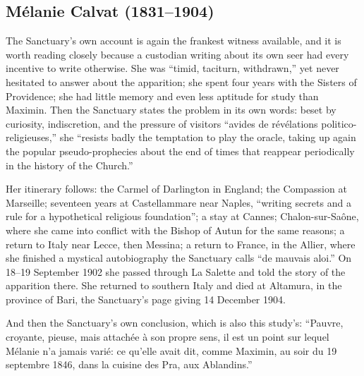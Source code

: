 \subsection{Mélanie Calvat (1831--1904)}

The Sanctuary's own account is again the frankest witness available,
and it is worth reading closely because a custodian writing about
its own seer had every incentive to write otherwise. She was
``timid, taciturn, withdrawn,'' yet never hesitated to answer about
the apparition; she spent four years with the Sisters of Providence;
she had little memory and even less aptitude for study than Maximin.
Then the Sanctuary states the problem in its own words: beset by
curiosity, indiscretion, and the pressure of visitors ``avides de
révélations politico-religieuses,'' she ``resists badly the
temptation to play the oracle, taking up again the popular
pseudo-prophecies about the end of times that reappear periodically
in the history of the Church.''

Her itinerary follows: the Carmel of Darlington in England; the
Compassion at Marseille; seventeen years at Castellammare near
Naples, ``writing secrets and a rule for a hypothetical religious
foundation''; a stay at Cannes; Chalon-sur-Saône, where she came into
conflict with the Bishop of Autun for the same reasons; a return to
Italy near Lecce, then Messina; a return to France, in the Allier,
where she finished a mystical autobiography the Sanctuary calls ``de
mauvais aloi.'' On 18--19 September 1902 she passed through La
Salette and told the story of the apparition there. She returned to
southern Italy and died at Altamura, in the province of Bari, the
Sanctuary's page giving 14 December 1904.

And then the Sanctuary's own conclusion, which is also this study's:
``Pauvre, croyante, pieuse, mais attachée à son propre sens, il est
un point sur lequel Mélanie n'a jamais varié: ce qu'elle avait dit,
comme Maximin, au soir du 19 septembre 1846, dans la cuisine des
Pra, aux Ablandins.''

